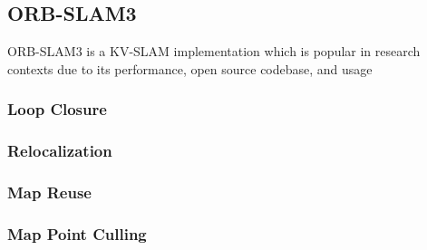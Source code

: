 \subsection{ORB-SLAM3}

ORB-SLAM3 is a KV-SLAM implementation which is popular in research contexts due to its performance, open source codebase, and usage 

\subsubsection{Loop Closure}
\subsubsection{Relocalization}
\subsubsection{Map Reuse}
\subsubsection{Map Point Culling}